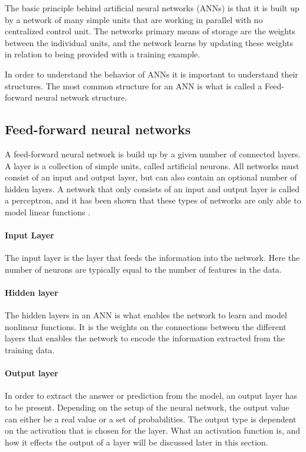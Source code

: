 The basic principle behind artificial neural networks (ANNs) is that it is built up by a network of many simple units that are working in parallel with no centralized control unit. The networks primary means of storage are the weights between the individual units, and the network learns by updating these weights in relation to being provided with a training example.

In order to understand the behavior of ANNs it is important to understand their structures. The most common structure for an ANN is what is called a Feed-forward neural network structure.

\subsection{Feed-forward neural networks}
A feed-forward neural network is build up by a given number of connected layers. A layer is a collection of simple units, called artificial neurons. All networks must consist of an input and output layer, but can also contain an optional number of hidden layers. A network that only consists of an input and output layer is called a perceptron, and it has been shown that these types of networks are only able to model linear functions \citep{Minsky1969}.

\paragraph{Input Layer}
The input layer is the layer that feeds the information into the network. Here the number of neurons are typically equal to the number of features in the data.

\paragraph{Hidden layer}
The hidden layers in an ANN is what enables the network to learn and model nonlinear functions. It is the weights on the connections between the different layers that enables the network to encode the information extracted from the training data.

\paragraph{Output layer}
In order to extract the answer or prediction from the model, an output layer has to be present. Depending on the setup of the neural network, the output value can either be a real value or a set of probabilities. The output type is dependent on the activation that is chosen for the layer. What an activation function is, and how it effects the output of a layer will be discussed later in this section.

